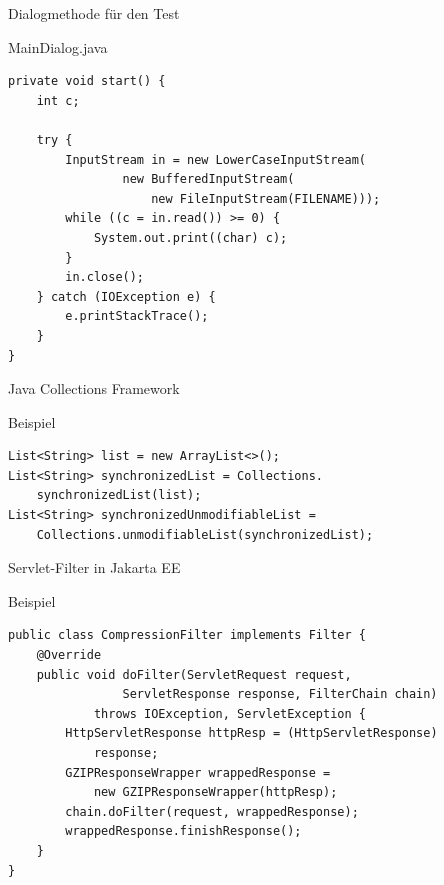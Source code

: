 \begin{frame}[fragile]{Dialogmethode für den Test}
	\begin{exampleblock}{MainDialog.java}
		\begin{lstlisting}
private void start() {
    int c;
    
    try {
        InputStream in = new LowerCaseInputStream(
                new BufferedInputStream(
                    new FileInputStream(FILENAME)));
        while ((c = in.read()) >= 0) {
            System.out.print((char) c);
        }
        in.close();
    } catch (IOException e) {
        e.printStackTrace();
    }
}
        \end{lstlisting}
	\end{exampleblock}
\end{frame}

\begin{frame}[fragile]{Java Collections Framework}
	\begin{exampleblock}{Beispiel}
		\begin{lstlisting}
List<String> list = new ArrayList<>();
List<String> synchronizedList = Collections.
    synchronizedList(list);
List<String> synchronizedUnmodifiableList = 
    Collections.unmodifiableList(synchronizedList);

        \end{lstlisting}
	\end{exampleblock}
\end{frame}

\begin{frame}[fragile]{Servlet-Filter in Jakarta EE}
	\begin{exampleblock}{Beispiel}
		\begin{lstlisting}
public class CompressionFilter implements Filter {
    @Override
    public void doFilter(ServletRequest request, 
                ServletResponse response, FilterChain chain) 
            throws IOException, ServletException {
        HttpServletResponse httpResp = (HttpServletResponse) 
            response;
        GZIPResponseWrapper wrappedResponse = 
            new GZIPResponseWrapper(httpResp);
        chain.doFilter(request, wrappedResponse);
        wrappedResponse.finishResponse();
    }
}
        \end{lstlisting}
	\end{exampleblock}
\end{frame}
